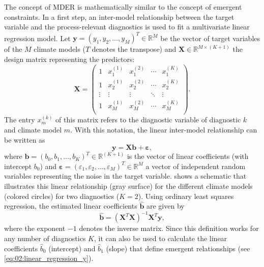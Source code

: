 The concept of \ac{MDER} is mathematically similar to the concept of emergent
constraints. In a first step, an inter-model relationship between the target
variable and the process-relevant diagnostics is used to fit a multivariate
linear regression model. Let $\bm{y} = \left( y_1, y_2, \ldots, y_M \right)^T
\in \mathbb{R}^M$ be the vector of target variables of the $M$ climate models
($T$ denotes the transpose) and $\bm{X} \in \mathbb{R}^{M \times (K + 1)}$ the
design matrix representing the predictors:
\begin{equation}
  \bm{X} =
  \begin{pmatrix}
    1 & x_1^{(1)} & x_1^{(2)} & \cdots & x_1^{(K)} \\
    1 & x_2^{(1)} & x_2^{(2)} & \cdots & x_2^{(K)} \\
    \vdots & \vdots & \vdots & \ddots & \vdots \\
    1 & x_M^{(1)} & x_M^{(2)} & \cdots & x_M^{(K)} \\
  \end{pmatrix}.
  \label{eq:02:design_matrix}
\end{equation}
The entry $x_m^{(k)}$ of this matrix refers to the diagnostic variable of
diagnostic $k$ and climate model $m$. With this notation, the linear
inter-model relationship can be written as
\begin{equation}
  \bm{y} = \bm{X} \bm{b} + \bm{\varepsilon},
  \label{eq:02:multivariate_linear_model}
\end{equation}
where $\bm{b} = \left( b_0, b_1, \ldots, b_K \right)^T \in \mathbb{R}^{(K +
  1)}$ is the vector of linear coefficients (with intercept $b_0$) and
$\bm{\varepsilon} = \left( \varepsilon_1, \varepsilon_2, \ldots, \varepsilon_M
\right)^T \in \mathbb{R}^M$ a vector of independent random variables
representing the noise in the target variable.  shows a
schematic that illustrates this linear relationship (gray surface) for the
different climate models (colored circles) for two diagnostics ($K = 2$). Using
ordinary least squares regression, the estimated linear coefficients
$\hat{\bm{b}}$ are given by
\begin{equation}
  \hat{\bm{b}} = \left( \bm{X}^T \bm{X} \right)^{-1} \bm{X}^T \bm{y},
  \label{eq:02:linear_coefficients}
\end{equation}
where the exponent $-1$ denotes the inverse matrix. Since this definition works
for any number of diagnostics $K$, it can also be used to calculate the linear
coefficients $\hat{b}_0$ (intercept) and $\hat{b}_1$ (slope) that define
emergent relationships (see \cref{eq:02:linear_regression_y}).

